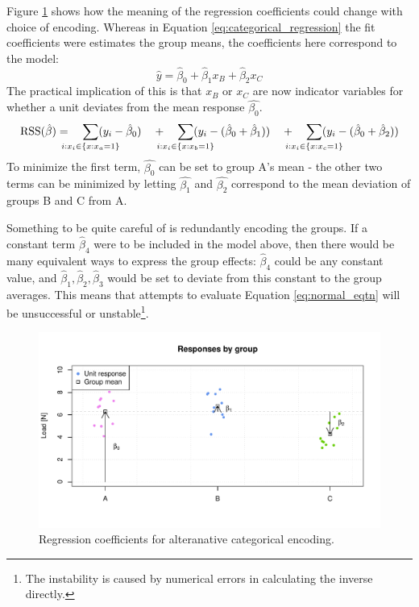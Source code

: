 \documentclass[11pt,a4paper,article]{memoir} %
\begin{document}
Figure \ref{fig:alt_categorical_regression} shows how the meaning of the regression coefficients could change with choice of encoding. Whereas in Equation \ref{eq:categorical_regression} the fit coefficients were estimates the group means, the coefficients here correspond to the model:
\begin{equation}
	\hat{y} = \hat{\beta}_0 + \hat{\beta}_1x_B + \hat{\beta}_2x_C
\end{equation}
The practical implication of this is that $x_B$ or $x_C$ are now indicator variables for whether a unit deviates from the mean response $\hat{\beta_0}$.
\begin{equation}
	\text{RSS}(\hat{\beta}) = \quad
					\smashoperator{\sum_{i: x_i \in \{x: x_a = 1\}}}(y_i - \hat{\beta}_0) \quad + \quad
					 \smashoperator{\sum_{i: x_i \in \{x: x_b = 1\}}}(y_i - (\hat{\beta}_0 + \hat{\beta}_1)) \quad + \quad
					 \smashoperator{\sum_{i: x_i \in \{x: x_c = 1\}}}(y_i - (\hat{\beta}_0 + \hat{\beta}_2))
\end{equation}
To minimize the first term, $\hat{\beta_0}$ can be set to group A's mean - the other two terms can be minimized by letting $\hat{\beta_1}$ and $\hat{\beta_2}$ correspond to the mean deviation of groups B and C from A.

 Something to be quite careful of is redundantly encoding the groups. If a constant term $\hat{\beta}_4$ were to be included in the model above, then there would be many equivalent ways to express the group effects: $\hat{\beta}_4$ could be any constant value, and $\hat{\beta}_1, \hat{\beta}_2, \hat{\beta}_3$ would be set to deviate from this constant to the group averages. This means that attempts to evaluate Equation \ref{eq:normal_eqtn} will be unsuccessful or unstable\footnote{The instability is caused by numerical errors in calculating the inverse directly.}.
 
\begin{figure}[h]
\includegraphics[width=\textwidth]{alt_categorical_regression.pdf}
\caption{Regression coefficients for alteranative categorical encoding.}
\label{fig:alt_categorical_regression}
\end{figure}
\end{document}
